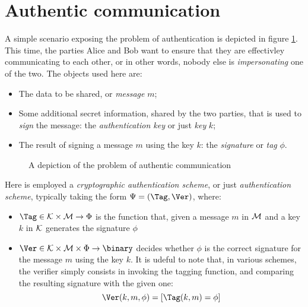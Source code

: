 
\section{Authentic communication}


A simple scenario exposing the problem of authentication is depicted in figure \ref{fig:authentication}. This time, the parties Alice and Bob want to ensure that they are effectivley communicating to each other, or in other words, nobody else is \emph{impersonating} one of the two. The objects used here are:
\begin{itemize}
    \item The data to be shared, or \emph{message} $m$;
    \item Some additional secret information, shared by the two parties, that is used to \emph{sign} the message: the \emph{authentication key} or just \emph{key} $k$;
    \item The result of signing a message $m$ using the key $k$: the \emph{signature} or \emph{tag} $\phi$.
\end{itemize}

\begin{figure}[ht]
    \centering

    \caption{A depiction of the problem of authentic communication}
    \label{fig:authentication}
\end{figure}

Here is employed a \emph{cryptographic authentication scheme}, or just \emph{authentication scheme}, typically taking the form $\Psi = (\Tag, \Ver)$, where:
\begin{itemize}
    \item $\Tag \in \K \times \M \to \Phi$ is the function that, given a message $m$ in $\mathcal{M}$ and a key $k$ in $\mathcal{K}$ generates the signature $\phi$
    \item $\Ver \in \K \times \M \times \Phi \to \binary$ decides whether $\phi$ is the correct signature for the message $m$ using the key $k$. It is udeful to note that, in various schemes, the verifier simply consists in invoking the tagging function, and comparing the resulting signature with the given one:
    \[
        \Ver(k, m, \phi) = [\Tag(k, m) = \phi]
    \]
\end{itemize}

